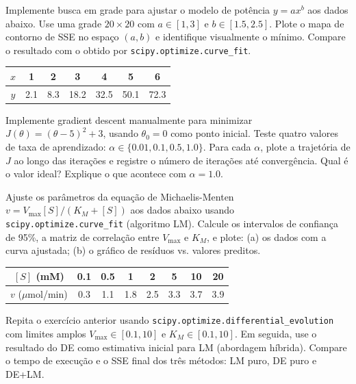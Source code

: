 \begin{exercicio}
Implemente busca em grade para ajustar o modelo de potência $y = a x^b$ aos dados abaixo.
Use uma grade $20 \times 20$ com $a \in [1, 3]$ e $b \in [1.5, 2.5]$. Plote o mapa de
contorno de SSE no espaço $(a, b)$ e identifique visualmente o mínimo. Compare o resultado
com o obtido por \texttt{scipy.optimize.curve\_fit}.

\begin{center}
\begin{tabular}{c|cccccc}
$x$ & 1 & 2 & 3 & 4 & 5 & 6 \\
\hline
$y$ & 2.1 & 8.3 & 18.2 & 32.5 & 50.1 & 72.3
\end{tabular}
\end{center}
\end{exercicio}

\begin{exercicio}
Implemente gradient descent manualmente para minimizar $J(\theta) = (\theta - 5)^2 + 3$,
usando $\theta_0 = 0$ como ponto inicial. Teste quatro valores de taxa de aprendizado:
$\alpha \in \{0.01, 0.1, 0.5, 1.0\}$. Para cada $\alpha$, plote a trajetória de $J$ ao
longo das iterações e registre o número de iterações até convergência. Qual é o valor ideal?
Explique o que acontece com $\alpha = 1.0$.
\end{exercicio}

\begin{exercicio}
Ajuste os parâmetros da equação de Michaelis-Menten $v = V_\text{max}[S]/(K_M + [S])$
aos dados abaixo usando \texttt{scipy.optimize.curve\_fit} (algoritmo LM). Calcule os
intervalos de confiança de 95\%, a matriz de correlação entre $V_\text{max}$ e $K_M$, e
plote: (a) os dados com a curva ajustada; (b) o gráfico de resíduos vs. valores preditos.

\begin{center}
\begin{tabular}{c|ccccccc}
$[S]$ (mM) & 0.1 & 0.5 & 1 & 2 & 5 & 10 & 20 \\
\hline
$v$ ($\mu$mol/min) & 0.3 & 1.1 & 1.8 & 2.5 & 3.3 & 3.7 & 3.9
\end{tabular}
\end{center}
\end{exercicio}

\begin{exercicio}
Repita o exercício anterior usando \texttt{scipy.optimize.differential\_evolution} com
limites amplos $V_\text{max} \in [0.1, 10]$ e $K_M \in [0.1, 10]$. Em seguida, use
o resultado do DE como estimativa inicial para LM (abordagem híbrida). Compare o tempo
de execução e o SSE final dos três métodos: LM puro, DE puro e DE+LM.
\end{exercicio}

